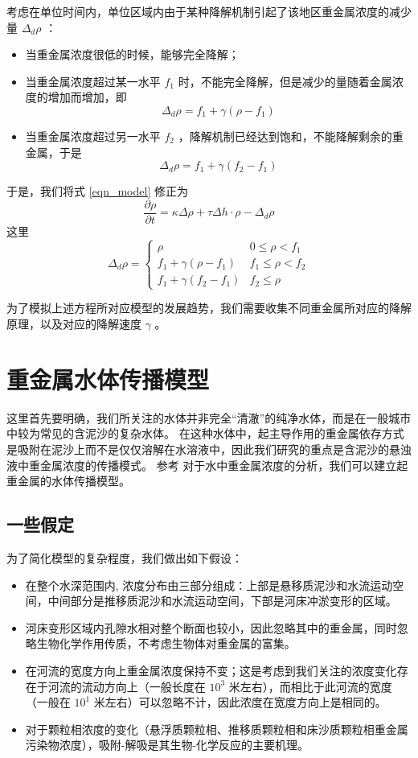 \documentclass[a4paper]{article}
\begin{document}
考虑在单位时间内，单位区域内由于某种降解机制引起了该地区重金属浓度的减少量 $\Delta_d \rho$ ：
\begin{itemize}
	\item 当重金属浓度很低的时候，能够完全降解；
	\item 当重金属浓度超过某一水平 $f_1$ 时，不能完全降解，但是减少的量随着金属浓度的增加而增加，即
		$$ \Delta_d \rho = f_1 + \gamma (\rho - f_1) $$
	\item 当重金属浓度超过另一水平 $f_2$ ，降解机制已经达到饱和，不能降解剩余的重金属，于是
		$$ \Delta_d \rho = f_1 + \gamma (f_2 - f_1) $$
\end{itemize}
于是，我们将式 \eqref{eqn_model} 修正为
$$ \frac{\partial \rho}{\partial t} = \kappa \Delta \rho + \tau \Delta h \cdot \rho - \Delta_d \rho $$
这里
\[
	\Delta_d \rho = 
	\begin{cases}
		\rho & 0 \le \rho < f_1 \\
		f_1 + \gamma (\rho - f_1) & f_1 \le \rho < f_2 \\
		f_1 + \gamma (f_2 - f_1) & f_2 \le \rho
	\end{cases}
\]

为了模拟上述方程所对应模型的发展趋势，我们需要收集不同重金属所对应的降解原理，以及对应的降解速度 $\gamma$ 。

\section{重金属水体传播模型}
这里首先要明确，我们所关注的水体并非完全“清澈”的纯净水体，而是在一般城市中较为常见的含泥沙的复杂水体。
在这种水体中，起主导作用的重金属依存方式是吸附在泥沙上而不是仅仅溶解在水溶液中，因此我们研究的重点是含泥沙的悬浊液中重金属浓度的传播模式。
参考 \cite{hsl:515} 对于水中重金属浓度的分析，我们可以建立起重金属的水体传播模型。
\subsection{一些假定}
为了简化模型的复杂程度，我们做出如下假设：
\begin{itemize}
	\item 在整个水深范围内, 浓度分布由三部分组成：上部是悬移质泥沙和水流运动空间，中间部分是推移质泥沙和水流运动空间，下部是河床冲淤变形的区域。
	\item 河床变形区域内孔隙水相对整个断面也较小，因此忽略其中的重金属，同时忽略生物化学作用传质，不考虑生物体对重金属的富集。
	\item 在河流的宽度方向上重金属浓度保持不变；这是考虑到我们关注的浓度变化存在于河流的流动方向上（一般长度在 $10^3$ 米左右），而相比于此河流的宽度（一般在 $10^1$ 米左右）可以忽略不计，因此浓度在宽度方向上是相同的。
	\item 对于颗粒相浓度的变化（悬浮质颗粒相、推移质颗粒相和床沙质颗粒相重金属污染物浓度），吸附-解吸是其生物-化学反应的主要机理。
\end{itemize}
\end{document}
